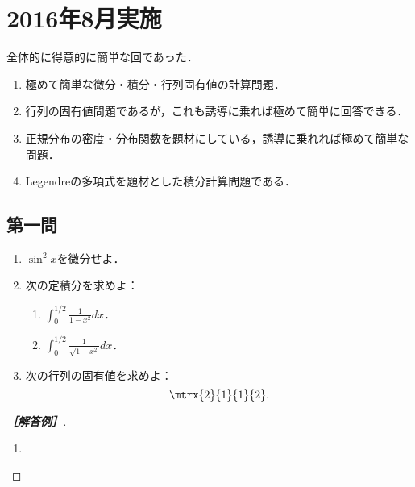\documentclass[uplatex,dvipdfmx]{jsarticle}
\begin{document}
\section{2016年8月実施}

\begin{tcolorbox}[colframe=ForestGreen, colback=ForestGreen!10!white,breakable,colbacktitle=ForestGreen!40!white,coltitle=black,fonttitle=\bfseries\sffamily,
    title=概観]
    全体的に得意的に簡単な回であった．
    \begin{enumerate}[{第}1{問}]
        \item 極めて簡単な微分・積分・行列固有値の計算問題．
        \item 行列の固有値問題であるが，これも誘導に乗れば極めて簡単に回答できる．
        \item 正規分布の密度・分布関数を題材にしている，誘導に乗れれば極めて簡単な問題．
        \item Legendreの多項式を題材とした積分計算問題である．
    \end{enumerate}
\end{tcolorbox}

\subsection{第一問}

\begin{tcolorbox}[colframe=ForestGreen, colback=ForestGreen!10!white,breakable,colbacktitle=ForestGreen!40!white,coltitle=black,fonttitle=\bfseries\sffamily,
    title=第１問]
    \begin{problem}\mbox{}
        \begin{enumerate}[{問}1]
            \item $\sin^2x$を微分せよ．
            \item 次の定積分を求めよ：
            \begin{enumerate}[(1)]
                \item $\int^{1/2}_0\frac{1}{1-x^2}dx$．
                \item $\int^{1/2}_0\frac{1}{\sqrt{1-x^2}}dx$．
            \end{enumerate}
            \item 次の行列の固有値を求めよ：
            \[\mtrx{2}{1}{1}{2}.\]
        \end{enumerate}
    \end{problem}
\end{tcolorbox}
\begin{proof}[\textbf{\underline{［解答例］}}]\mbox{}
    \begin{enumerate}
        \item 
    \end{enumerate}
\end{proof}
\end{document}

